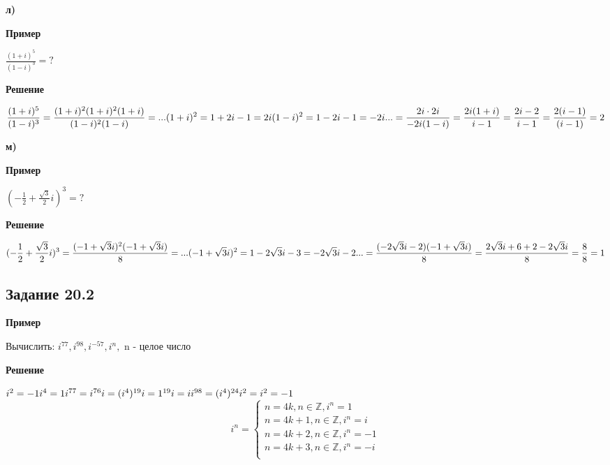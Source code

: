 \documentclass[12pt]{article}
\begin{document}
\newpage
\textbf{л)}\\
\begin{center}\textbf{Пример}\end{center}
$
\displaystyle
\frac{(1+i)^5}{(1-i)^3}=?
$\\
\begin{center}\textbf{Решение}\end{center}
$
\displaystyle
\frac{(1+i)^5}{(1-i)^3}=
\frac{(1+i)^2(1+i)^2(1+i)}{(1-i)^2(1-i)}=...
\\
\\
(1+i)^2 = 1+2i-1=2i\\
(1-i)^2 = 1-2i-1=-2i\\
\\
...=\frac{2i\cdot2i}{-2i(1-i)}=
\frac{2i(1+i)}{i-1}=
\frac{2i-2}{i-1}=
\frac{2(i-1)}{(i-1)}=2
$

\newpage
\textbf{м)}\\
\begin{center}\textbf{Пример}\end{center}
$
\displaystyle
(-\frac{1}{2} +\frac{\sqrt3}{2}i)^3=?
$\\
\begin{center}\textbf{Решение}\end{center}
$
\displaystyle
(-\frac{1}{2} +\frac{\sqrt3}{2}i)^3=
\frac{(-1+\sqrt3i)^2(-1+\sqrt3i)}{8}=...\\
\\
(-1+\sqrt3i)^2=1-2\sqrt3i-3=-2\sqrt3i-2\\
\\
...=\frac{(-2\sqrt3i-2)(-1+\sqrt3i)}{8}=
\frac{2\sqrt3i+6+2-2\sqrt3i}{8}=
\frac{8}{8}=1
$

\newpage
\subsection{Задание 20.2}

\begin{center}\textbf{Пример}\end{center}
Вычислить: 
$
i^{77}, i^{98}, i^{-57}, i^n,
$ n  - целое число\\
\begin{center}\textbf{Решение}\end{center}
$
i^2=-1\\
i^4=1\\
i^{77}=i^{76}i=(i^4)^{19}i=1^{19}i=i\\
i^{98}=(i^4)^{24}i^2=i^2=-1\\
$
\begin{equation*}
i^n= 
 \begin{cases}
n = 4k,n \in \mathbb {Z}, i^n = 1\\
n = 4k+1,n \in \mathbb {Z}, i^n = i\\
n = 4k+2,n \in \mathbb {Z}, i^n = -1\\
n = 4k+3,n \in \mathbb {Z}, i^n = -i\\   
 \end{cases}
\end{equation*}
\end{document}
